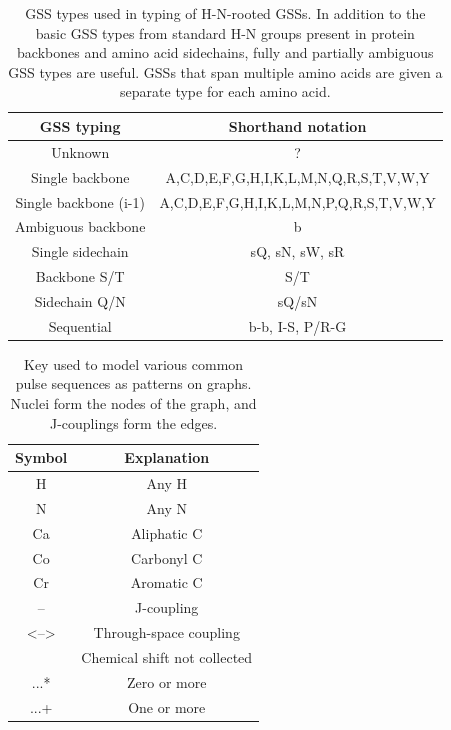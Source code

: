 \begin{table}[h]
    \begin{tabular}{ | c | c | }
    \hline
      GSS typing            &   Shorthand notation    \\ \hline
      \hline
      Unknown               &   ?                     \\ \hline
      Single backbone       &   A,C,D,E,F,G,H,I,K,L,M,N,Q,R,S,T,V,W,Y   \\ \hline
      Single backbone (i-1) &   A,C,D,E,F,G,H,I,K,L,M,N,P,Q,R,S,T,V,W,Y   \\ \hline
      Ambiguous backbone    &   b                     \\ \hline
      Single sidechain      &   sQ, sN, sW, sR        \\ \hline
      Backbone S/T          &   S/T                   \\ \hline
      Sidechain Q/N         &   sQ/sN                 \\ \hline
      Sequential            &   b-b, I-S, P/R-G       \\ \hline
    \end{tabular}
    \caption[GSS types used in typing of H-N-rooted GSSs.]
            {GSS types used in typing of H-N-rooted GSSs.  In addition to the
             basic GSS types from standard H-N groups present in protein
             backbones and amino acid sidechains,
             fully and partially ambiguous GSS types are useful.  GSSs that
             span multiple amino acids are given a separate type for each
             amino acid.}
    \label{hn_gss_types}
\end{table}

\begin{table}
    \begin{tabular}{ | c | c | }
      \hline
      Symbol    &  Explanation              \\  \hline
      \hline
      H         &  Any H                    \\  \hline
      N         &  Any N                    \\  \hline
      Ca        &  Aliphatic C              \\  \hline
      Co        &  Carbonyl C               \\  \hline
      Cr        &  Aromatic C               \\  \hline
      --        &  J-coupling               \\  \hline
      <-->      &  Through-space coupling   \\  \hline
      [...]     &  Chemical shift not collected  \\  \hline
      ...*      &  Zero or more             \\  \hline
      ...+      &  One or more              \\  \hline
    \end{tabular}
    \caption[Key used to model various common pulse sequences as patterns on graphs.]
            {Key used to model various common pulse sequences as patterns
             on graphs.  Nuclei form the nodes of the graph, and J-couplings
             form the edges.}
    \label{pulse_sequence_key}
\end{table}

